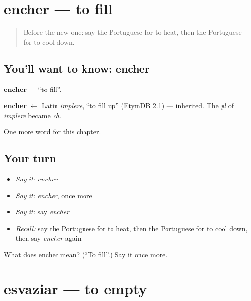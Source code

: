 \section[encher]{encher — to fill}

\label{lesson:PT-C202-encher}



\begin{quote}
Before the new one: say the Portuguese for to heat, then the Portuguese for to cool down.
\end{quote}

\subsection*{You'll want to know: encher}
\textbf{encher} — \textquotedblleft{}to fill\textquotedblright{}.

\begin{cousinweb}
\textbf{encher} $\leftarrow$ Latin \emph{implere}, \textquotedblleft{}to fill up\textquotedblright{} (EtymDB 2.1) — inherited. The \emph{pl} of \emph{implere} became \emph{ch}.
\end{cousinweb}

\begin{grammarlens}[title={What you've built}]
One more word for this chapter.
\end{grammarlens}

\subsection*{Your turn}
\begin{itemize}
\raggedright
  \item \emph{Say it:} \emph{encher}
  \item \emph{Say it:} \emph{encher}, once more
  \item \emph{Say it:} say \emph{encher}
  \item \emph{Recall:} say the Portuguese for to heat, then the Portuguese for to cool down, then say \emph{encher} again
\end{itemize}

\begin{tcolorbox}[breakable,colback=teal!4,colframe=teal!35!black,title={Before you move on}]
What does encher mean? (\textquotedblleft{}To fill\textquotedblright{}.) Say it once more.
\end{tcolorbox}
\section[esvaziar]{esvaziar — to empty}

